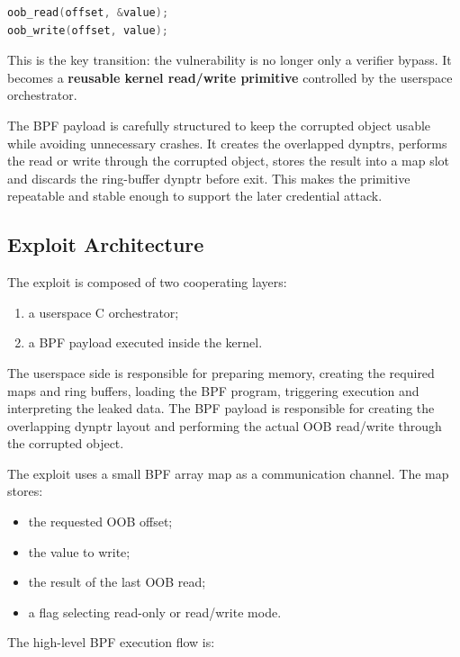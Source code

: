 \documentclass[../main.tex]{subfiles}
\begin{document}
\begin{lstlisting}[language=C, caption={Abstract exploit interface.}]
oob_read(offset, &value);
oob_write(offset, value);
\end{lstlisting}

This is the key transition: the vulnerability is no longer only a verifier bypass. It becomes a \textbf{reusable kernel read/write primitive} controlled by the userspace orchestrator.

The BPF payload is carefully structured to keep the corrupted object usable while avoiding unnecessary crashes. It creates the overlapped dynptrs, performs the read or write through the corrupted object, stores the result into a map slot and discards the ring-buffer dynptr before exit. This makes the primitive repeatable and stable enough to support the later credential attack.

\subsection{Exploit Architecture}

The exploit is composed of two cooperating layers:

\begin{enumerate}
    \item a userspace C orchestrator;
    \item a BPF payload executed inside the kernel.
\end{enumerate}

The userspace side is responsible for preparing memory, creating the required maps and ring buffers, loading the BPF program, triggering execution and interpreting the leaked data. The BPF payload is responsible for creating the overlapping dynptr layout and performing the actual OOB read/write through the corrupted object.

The exploit uses a small BPF array map as a communication channel. The map stores:

\begin{itemize}
    \item the requested OOB offset;
    \item the value to write;
    \item the result of the last OOB read;
    \item a flag selecting read-only or read/write mode.
\end{itemize}

The high-level BPF execution flow is:
\end{document}
